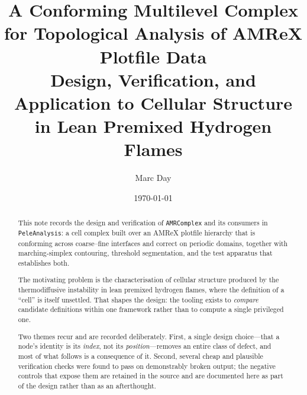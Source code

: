 \documentclass[11pt,oneside]{report}
\title{\bfseries A Conforming Multilevel Complex for Topological Analysis of
       AMReX Plotfile Data\\[0.4em]
       \large Design, Verification, and Application to Cellular Structure in
       Lean Premixed Hydrogen Flames}
\author{Marc Day}
\date{\today}
\begin{document}
\maketitle

\begin{abstract}
\noindent
This note records the design and verification of \texttt{AMRComplex} and its
consumers in \texttt{PeleAnalysis}: a cell complex built over an AMReX plotfile
hierarchy that is conforming across coarse--fine interfaces and correct on
periodic domains, together with marching-simplex contouring, threshold
segmentation, and the test apparatus that establishes both.

The motivating problem is the characterisation of cellular structure produced
by the thermodiffusive instability in lean premixed hydrogen flames, where the
definition of a ``cell'' is itself unsettled. That shapes the design: the
tooling exists to \emph{compare} candidate definitions within one framework
rather than to compute a single privileged one.

Two themes recur and are recorded deliberately. First, a single design
choice---that a node's identity is its \emph{index}, not its
\emph{position}---removes an entire class of defect, and most of what follows
is a consequence of it. Second, several cheap and plausible verification
checks were found to pass on demonstrably broken output; the negative controls
that expose them are retained in the source and are documented here as part of
the design rather than as an afterthought.
\end{abstract}

\tableofcontents











\appendix





\end{document}
